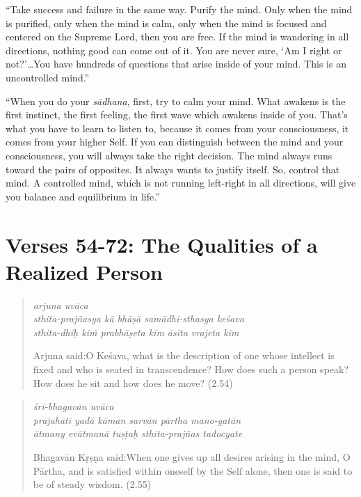 \documentclass[12pt, twoside, openright]{memoir}
\begin{document}
\enquote{Take success and failure in the same way. Purify the mind. Only when the mind is purified, only when the mind is calm, only when the mind is focused and centered on the Supreme Lord, then you are free. If the mind is wandering in all directions, nothing good can come out of it. You are never sure, \enquote{Am I right or not?}\ldots You have hundreds of questions that arise inside of your mind. This is an uncontrolled mind.}

\enquote{When you do your \textit{sādhana}, first, try to calm your mind. What awakens is the first instinct, the first feeling, the first wave which awakens inside of you. That's what you have to learn to listen to, because it comes from your consciousness, it comes from your higher Self. If you can distinguish between the mind and your consciousness, you will always take the right decision. The mind always runs toward the pairs of opposites. It always wants to justify itself. So, control that mind. A controlled mind, which is not running left-right in all directions, will give you balance and equilibrium in life.}

\section{Verses 54-72: The Qualities of a Realized Person}\label{sec-verses-54-72-the-qualities-of-a-realized-person}


\par
\begin{verse}
\textit{arjuna uvāca} \\
\textit{sthita-prajñasya kā bhāṣā samādhi-sthasya keśava} \\
\textit{sthita-dhīḥ kiṁ prabhāṣeta kim āsīta vrajeta kim}

\noindent \quad Arjuna said:\linebreak O Keśava, what is the description of one whose intellect is fixed and who is seated in transcendence? How does such a person speak? How does he sit and how does he move? (2.54)
\end{verse}
\par



\par
\begin{verse}
\textit{śrī-bhagavān uvāca} \\
\textit{prajahāti yadā kāmān sarvān pārtha mano-gatān} \\
\textit{ātmany evātmanā tuṣṭaḥ sthita-prajñas tadocyate}

\noindent \quad Bhagavān Kṛṣṇa said:\linebreak When one gives up all desires arising in the mind, O Pārtha, and is satisfied within oneself by the Self alone, then one is said to be of steady wisdom. (2.55)
\end{verse}
\par
\end{document}

